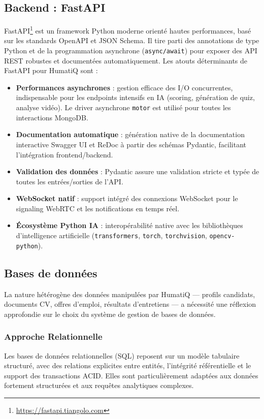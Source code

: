 \subsection{Backend : FastAPI}
FastAPI\footnote{\url{https://fastapi.tiangolo.com}} est un framework Python moderne orienté hautes performances, basé sur les standards OpenAPI et JSON Schema. Il tire parti des annotations de type Python et de la programmation asynchrone (\texttt{async/await}) pour exposer des API REST robustes et documentées automatiquement.
\noindent Les atouts déterminants de FastAPI pour HumatiQ sont :
\begin{itemize}
    \item \textbf{Performances asynchrones} : gestion efficace des I/O concurrentes, indispensable pour les endpoints intensifs en IA (scoring, génération de quiz, analyse vidéo). Le driver asynchrone \texttt{motor} est utilisé pour toutes les interactions MongoDB.
    \item \textbf{Documentation automatique} : génération native de la documentation interactive Swagger UI et ReDoc à partir des schémas Pydantic, facilitant l'intégration frontend/backend.
    \item \textbf{Validation des données} : Pydantic assure une validation stricte et typée de toutes les entrées/sorties de l'API.
    \item \textbf{WebSocket natif} : support intégré des connexions WebSocket pour le signaling WebRTC et les notifications en temps réel.
    \item \textbf{Écosystème Python IA} : interopérabilité native avec les bibliothèques d'intelligence artificielle (\texttt{transformers}, \texttt{torch}, \texttt{torchvision}, \texttt{opencv-python}).
\end{itemize}
\subsection{Bases de données}
La nature hétérogène des données manipulées par HumatiQ — profils candidats, documents CV, offres d'emploi, résultats d'entretiens — a nécessité une réflexion approfondie sur le choix du système de gestion de bases de données.
\subsubsection{Approche Relationnelle}
Les bases de données relationnelles (SQL) reposent sur un modèle tabulaire structuré, avec des relations explicites entre entités, l'intégrité référentielle et le support des transactions ACID. Elles sont particulièrement adaptées aux données fortement structurées et aux requêtes analytiques complexes.

